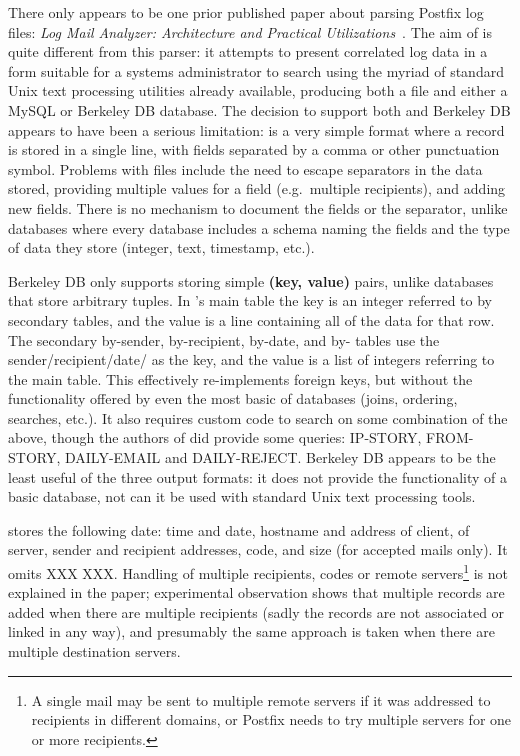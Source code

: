 There only appears to be one prior published paper about parsing Postfix
log files: \textit{Log Mail Analyzer: Architecture and Practical
Utilizations\/}~\cite{log-mail-analyser}.  The aim of \LMA{} is quite
different from this parser: it attempts to present correlated log data in a
form suitable for a systems administrator to search using the myriad of
standard Unix text processing utilities already available, producing both a
\CSV{} file and either a MySQL or Berkeley DB database.  The decision to
support both \CSV{} and Berkeley DB appears to have been a serious
limitation: \CSV{} is a very simple format where a record is stored in a
single line, with fields separated by a comma or other punctuation symbol.
Problems with \CSV{} files include the need to escape separators in the
data stored, providing multiple values for a field (e.g.\ multiple
recipients), and adding new fields.  There is no mechanism to document the
fields or the separator, unlike \SQL{} databases where every database
includes a schema naming the fields and the type of data they store
(integer, text, timestamp, etc.).

Berkeley DB only supports storing simple \textbf{(key, value)} pairs,
unlike \SQL{} databases that store arbitrary tuples.  In \LMA{}'s main
table the key is an integer referred to by secondary tables, and the value
is a \CSV{} line containing all of the data for that row.  The
secondary by-sender, by-recipient, by-date, and by-\IP{} tables use the
sender/recipient/date/\IP{} as the key, and the value is a \CSV{} list of integers
referring to the main table.  This effectively re-implements
\SQL{} foreign keys, but without the functionality offered by even the most
basic of \SQL{} databases (joins, ordering, searches, etc.).  It also
requires custom code to search on some combination of the above, though the
authors of \LMA{} did provide some queries: IP-STORY, FROM-STORY,
DAILY-EMAIL and DAILY-REJECT\@.  Berkeley DB appears to be the least useful
of the three output formats: it does not provide the functionality of a
basic \SQL{} database, not can it be used with standard Unix text
processing tools.

\LMA{} stores the following date: time and date, hostname and \IP{} address
of client, \IP{} of server, sender and recipient addresses, \SMTP{} code,
and size (for accepted mails only).  It omits XXX XXX\@.  Handling of
multiple recipients, \SMTP{} codes or remote servers\footnote{A single mail
may be sent to multiple remote servers if it was addressed to recipients in
different domains, or Postfix needs to try multiple servers for one or more
recipients.} is not explained in the paper; experimental observation shows
that multiple records are added when there are multiple recipients (sadly
the records are not associated or linked in any way), and presumably the
same approach is taken when there are multiple destination servers.

